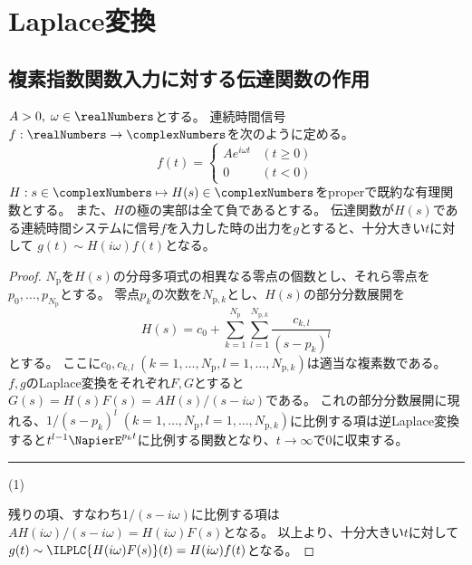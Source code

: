 \part{Laplace変換}
	\chapter{複素指数関数入力に対する伝達関数の作用}
		\begin{shadebox}
			$A>0,\;\omega \in \realNumbers$とする。
			連続時間信号$f: \realNumbers \to \complexNumbers$を次のように定める。
			\[
				f(t) =
				\begin{cases}
					Ae^{i\omega t} & (t\geq 0) \\
					0 & (t<0)
				\end{cases}
			\]
			$H: s\in\complexNumbers \mapsto H(s) \in \complexNumbers$をproperで既約な有理関数とする。
			また、$H$の極の実部は全て負であるとする。
			伝達関数が$H(s)$である連続時間システムに信号$f$を入力した時の出力を$g$とすると、十分大きい$t$に対して
			$g(t) \sim H(i\omega)f(t)$となる。
		\end{shadebox}
		\begin{proof}
			\quad\par
			$N_\text{p}$を$H(s)$の分母多項式の相異なる零点の個数とし、それら零点を$p_0,\dots,p_{N_\text{p}}$とする。
			零点$p_k$の次数を$N_{\text{p},k}$とし、$H(s)$の部分分数展開を
			\[ H(s) = c_0 + \sum_{k=1}^{N_\mathrm{p}} \sum_{l=1}^{N_{\mathrm{p},k}} \frac{c_{k,l}}{(s-p_k)^l} \]
			とする。
			ここに$c_0,c_{k,l}\;(k=1,\dots,N_\mathrm{p},l=1,\dots,N_{\mathrm{p},k})$は適当な複素数である。
			$f,g$のLaplace変換をそれぞれ$F,G$とすると$G(s) = H(s)F(s) = A H(s)/(s-i\omega)$である。
			これの部分分数展開に現れる、$1/(s-p_k)^l\;(k=1,\dots,N_\mathrm{p},l=1,\dots,N_{\mathrm{p},k})$に比例する項は逆Laplace変換すると$t^{l-1}\NapierE^{p_k t}$に比例する関数となり、$t\to\infty$で0に収束する。\hfill \rule{10cm}{0.4pt}(1)
			\par
			残りの項、すなわち$1/(s-i\omega)$に比例する項は$AH(i\omega)/(s-i\omega) = H(i\omega)F(s)$となる。
			以上より、十分大きい$t$に対して$g(t) \sim \ILPLC{H(i\omega)F(s)}(t) = H(i\omega)f(t)$となる。
		\end{proof}
